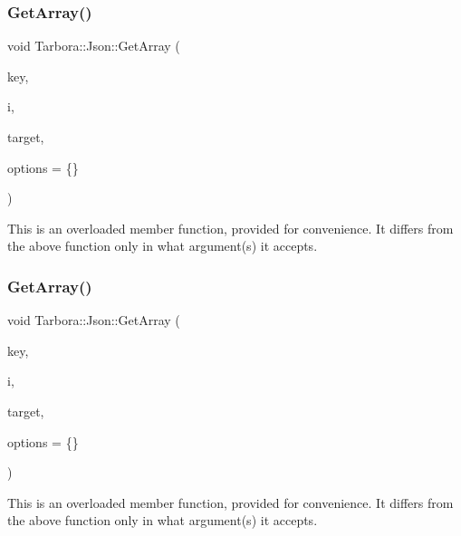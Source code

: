 \subsubsection{\texorpdfstring{Get\+Array()}{GetArray()}\hspace{0.1cm}{\footnotesize\ttfamily [3/12]}}
{\footnotesize\ttfamily void Tarbora\+::\+Json\+::\+Get\+Array (\begin{DoxyParamCaption}\item[{const char $\ast$}]{key,  }\item[{int}]{i,  }\item[{int $\ast$}]{target,  }\item[{\hyperlink{structTarbora_1_1JsonOptions}{Json\+Options}}]{options = {\ttfamily \{\}} }\end{DoxyParamCaption})}

This is an overloaded member function, provided for convenience. It differs from the above function only in what argument(s) it accepts. \mbox{\label{classTarbora_1_1Json_acac71de3b15d5ed9e9b8116900cef66b}} 
\subsubsection{\texorpdfstring{Get\+Array()}{GetArray()}\hspace{0.1cm}{\footnotesize\ttfamily [4/12]}}
{\footnotesize\ttfamily void Tarbora\+::\+Json\+::\+Get\+Array (\begin{DoxyParamCaption}\item[{const char $\ast$}]{key,  }\item[{int}]{i,  }\item[{float $\ast$}]{target,  }\item[{\hyperlink{structTarbora_1_1JsonOptions}{Json\+Options}}]{options = {\ttfamily \{\}} }\end{DoxyParamCaption})}

This is an overloaded member function, provided for convenience. It differs from the above function only in what argument(s) it accepts. \mbox{\label{classTarbora_1_1Json_aad0a63e46f3911c3ec985fb1369adc45}} 
